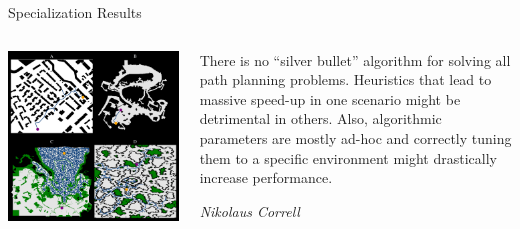 \documentclass[aspectratio=169]{beamer}
\makeatletter
\newcommand{\red}[1]{{\color{pureminimalistic@text@red} #1}}
\makeatother
\begin{document}
\begin{frame}{Specialization Results}
  \begin{columns}[T]
      \begin{column}{.6\linewidth}
      \centering
      \includegraphics[height=0.83\textheight]{figures/learned2.pdf}
      \end{column}
      \begin{column}{.4\linewidth}
      \epigraph{
      There is no “silver bullet” algorithm for solving all path planning problems. Heuristics that lead to massive speed-up in one scenario might be detrimental in others. Also, algorithmic parameters are mostly ad-hoc and correctly tuning them to a \red{specific environment} might drastically increase performance.
      }{\textit{
      Nikolaus Correll
      }}
      \end{column}
  \end{columns}
\end{frame}
\end{document}
